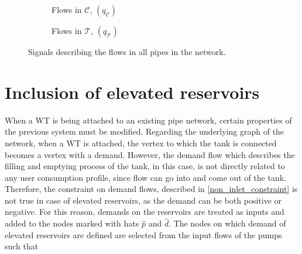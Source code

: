 \begin{figure}[H]
\centering
\begin{subfigure}{.49\textwidth}
\centering
   
  \caption{Flows in $\mathcal{C}$, $(q_{\mathcal{C}})$}
  \label{fig:sub31_example1}
\end{subfigure}
\begin{subfigure}{.49\textwidth}
\centering
   
  \caption{Flows in $\mathcal{T}$, $(q_{\mathcal{T}})$}
  \label{fig:sub31_example1}
\end{subfigure}
\caption{Signals describing the flows in all pipes in the network.}
\label{fig:flows_C_T}
\end{figure}

\newpage

\section{Inclusion of elevated reservoirs}
\label{inclusion_of_reservoirs}

When a WT is being attached to an existing pipe network, certain properties of the previous system must be modified. Regarding the underlying graph of the network, when a WT is attached, the vertex to which the tank is connected becomes a vertex with a demand. However, the demand flow which describes the filling and emptying process of the tank, in this case, is not directly related to any user consumption profile, since flow can go into and come out of the tank. Therefore, the constraint on demand flows, described in \eqref{non_inlet_constraint} is not true in case of elevated reservoirs, as the demand can be both positive or negative. For this reason, demands on the reservoirs are treated as inputs and added to the nodes marked with hats $\hat{p}$ and $\hat{d}$. The nodes on which demand of elevated reservoirs are defined are selected from the input flows of the pumps such that 

